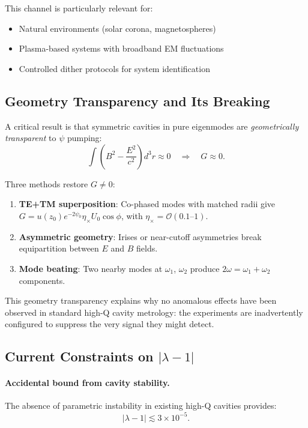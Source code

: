 \documentclass[aps,prd,twocolumn,superscriptaddress,floatfix,nofootinbib]{revtex4-2}
\newcommand{\lam}{\lambda}
\begin{document}
This channel is particularly relevant for:
\begin{itemize}[nosep]
\item Natural environments (solar corona, magnetospheres)
\item Plasma-based systems with broadband EM fluctuations
\item Controlled dither protocols for system identification
\end{itemize}

\subsection{Geometry Transparency and Its Breaking}\label{sec:geometry}

A critical result is that symmetric cavities in pure eigenmodes
are \emph{geometrically transparent} to $\psi$ pumping:
\begin{equation}
\int \left(B^2 - \frac{E^2}{c^2}\right) d^3r \approx 0
\quad \Rightarrow \quad G \approx 0.
\label{eq:transparency}
\end{equation}

Three methods restore $G \neq 0$:
\begin{enumerate}[nosep]
\item \textbf{TE+TM superposition}: Co-phased modes with matched radii
give $G = u(z_0)e^{-2\psi_0}\eta_\times U_0\cos\phi$, with
$\eta_\times = \mathcal{O}(0.1\text{--}1)$.
\item \textbf{Asymmetric geometry}: Irises or near-cutoff asymmetries
break equipartition between $E$ and $B$ fields.
\item \textbf{Mode beating}: Two nearby modes at $\omega_1$, $\omega_2$
produce $2\omega = \omega_1 + \omega_2$ components.
\end{enumerate}

This geometry transparency explains why no anomalous effects have been
observed in standard high-Q cavity metrology: the experiments are
inadvertently configured to suppress the very signal they might detect.

\subsection{Current Constraints on $|\lambda - 1|$}

\paragraph{Accidental bound from cavity stability.}
The absence of parametric instability in existing high-Q cavities
provides:
\begin{equation}
\boxed{|\lam - 1| \lesssim 3 \times 10^{-5}}.
\label{eq:accidental-bound}
\end{equation}
\end{document}
